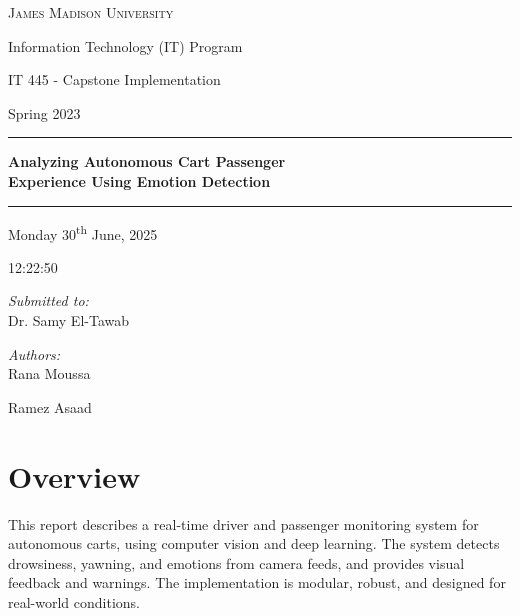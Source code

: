 \documentclass[12pt]{article}
\begin{document}
{
\begin{titlepage}
    \centering
    \vspace{1cm}
    {\Large\scshape James Madison University \par}
    \vspace{0.5cm}
    {\large Information Technology (IT) Program \par}
    {\large IT 445 - Capstone Implementation \par}
    {\large Spring 2023 \par}
    \vspace{1cm}
    \rule{\textwidth}{0.5pt}
    \vspace{0.5cm}
    {\bfseries\LARGE Analyzing Autonomous Cart Passenger\\[0.2cm]
    Experience Using Emotion Detection \par}
    \vspace{0.5cm}
    \rule{\textwidth}{0.5pt}
    \vspace{0.8cm}
    {\large Monday 30\textsuperscript{th} June, 2025 \par}
    {\large 12:22:50 \par}
    \vspace{0.5cm}
    \begin{minipage}{0.3\textwidth}
        \raggedright
        \textit{Submitted to:}\\
        Dr. Samy El-Tawab
    \end{minipage}
    \begin{minipage}{0.45\textwidth}
        \raggedleft
        \textit{Authors:}\\
        Rana Moussa \par Ramez Asaad
    \end{minipage}
    \vfill
\end{titlepage}
\restoregeometry}


\section{Overview}
This report describes a real-time driver and passenger monitoring system for autonomous carts, using computer vision and deep learning. The system detects drowsiness, yawning, and emotions from camera feeds, and provides visual feedback and warnings. The implementation is modular, robust, and designed for real-world conditions.
\end{document}
